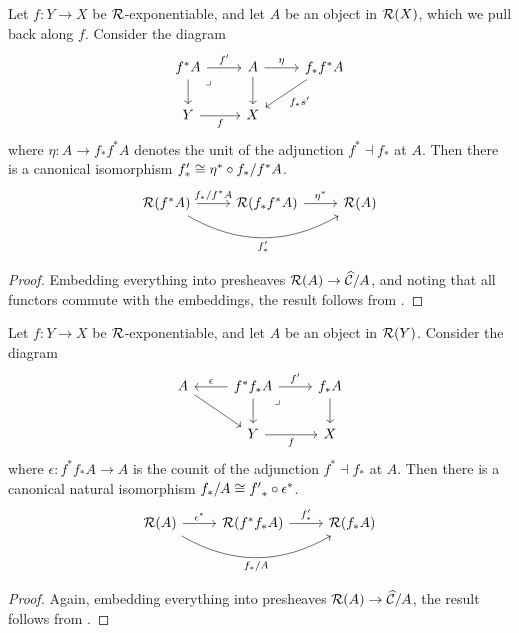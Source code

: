 \begin{lemma}
  Let $f : Y \to X$ be $\mathcal{R}$-exponentiable,
  and let $A$ be an object in $\mathcal{R}(X)$,
  which we pull back along $f$.
  Consider the diagram
  \[\begin{tikzcd}
    {f^* A} & {A} & {f_* f^* A} \\
    Y & X
    \arrow["{{{f'}}}", from=1-1, to=1-2]
    \arrow[from=1-1, to=2-1]
    \arrow["\lrcorner"{anchor=center, pos=0.125}, draw=none, from=1-1, to=2-2]
    \arrow["{{{\eta}}}", from=1-2, to=1-3]
    \arrow[from=1-2, to=2-2]
    \arrow["{{{f_* s'}}}", from=1-3, to=2-2]
    \arrow["f"', from=2-1, to=2-2]
  \end{tikzcd}\]
  where $\eta : A \to f_* f^* A$ denotes the unit of the adjunction
  $f^* \dashv f_*$ at $A$.
  Then there is a canonical isomorphism 
  ${f'_*} \cong \eta^* \circ f_* / f^* A$.
  \[ \begin{tikzcd}
    {\RR(f^* A)} & {\RR(f_* f^* A)} & {\RR(A)}
    \arrow["{f_* / f^* A}", from=1-1, to=1-2]
    \arrow["{{f'_*}}"', bend right, from=1-1, to=1-3]
    \arrow["{\eta^*}", from=1-2, to=1-3]
  \end{tikzcd} \]
\end{lemma}
\begin{proof}
  Embedding everything into presheaves $\mathcal{R}(A) \to \widehat{\mathcal{C}} / A$,
  and noting that all functors commute with the embeddings,
  the result follows from \cite[Lemma 1.13]{barton2026}.
\end{proof}

\begin{lemma}\label{lem:distributivity}
  Let $f : Y \to X$ be $\mathcal{R}$-exponentiable,
  and let $A$ be an object in $\mathcal{R}(Y)$.
  Consider the diagram
  \[\begin{tikzcd}
    A & {f^* f_* A} & {f_* A} \\
    & Y & X
    \arrow[from=1-1, to=2-2]
    \arrow["{\epsilon}"', from=1-2, to=1-1]
    \arrow["{f'}", from=1-2, to=1-3]
    \arrow[from=1-2, to=2-2]
    \arrow["\lrcorner"{anchor=center, pos=0.125}, draw=none, from=1-2, to=2-3]
    \arrow[from=1-3, to=2-3]
    \arrow["f"', from=2-2, to=2-3]
  \end{tikzcd}\]
  where $\epsilon : f^* f_* A \to A$
  is the counit of the adjunction $f^* \dashv f_*$ at $A$.
  Then there is a canonical natural isomorphism
  $f_*/A \cong {f'}_* \circ \epsilon^*$.
  \[
    \begin{tikzcd}
      {\RR(A)} & {\RR(f^* f_* A)} & {\RR(f_* A)}
      \arrow["{{\epsilon^*}}", from=1-1, to=1-2]
      \arrow["{f'_*}", from=1-2, to=1-3]
      \arrow["{f_*/A}"', from=1-1, to=1-3, bend right]
    \end{tikzcd}
  \]
\end{lemma}
\begin{proof}
  Again,
  embedding everything into presheaves $\mathcal{R}(A) \to \widehat{\mathcal{C}} / A$,
  the result follows from \cite[Lemma 1.14]{barton2026}.
\end{proof}

